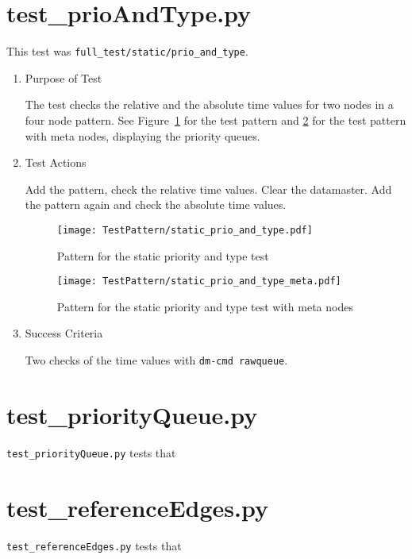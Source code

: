 \documentclass[12pt,a4paper]{report}
\begin{document}
\section{test\_prioAndType.py}
This test was \texttt{full\_test/static/prio\_and\_type}.
\begin{enumerate}
  \item Purpose of Test

The test checks the relative and the absolute time values for two nodes
in a four node pattern.
See Figure~\ref{fig:Pattern_for_the_static_priority_and_type_test} for
the test pattern and
\ref{fig:Pattern_for_the_static_priority_and_type_test_with_meta_nodes}
for the test pattern with meta nodes,
displaying the priority queues.
  \item Test Actions

  Add the pattern, check the relative time values. Clear the datamaster.
  Add the pattern again and check the absolute time values.
    \begin{figure}
        \centering
        \texttt{[image: TestPattern/static\_prio\_and\_type.pdf]}
        \caption{Pattern for the static priority and type test}
        \label{fig:Pattern_for_the_static_priority_and_type_test}
    \end{figure}
    \begin{figure}
        \centering
        \texttt{[image: TestPattern/static\_prio\_and\_type\_meta.pdf]}
        \caption{Pattern for the static priority and type test with meta nodes}
        \label{fig:Pattern_for_the_static_priority_and_type_test_with_meta_nodes}
    \end{figure}
  \item Success Criteria

  Two checks of the time values with \texttt{dm-cmd rawqueue}.
\end{enumerate}

\section{test\_priorityQueue.py}
\texttt{test\_priorityQueue.py} tests that

\section{test\_referenceEdges.py}
\texttt{test\_referenceEdges.py} tests that
\end{document}
